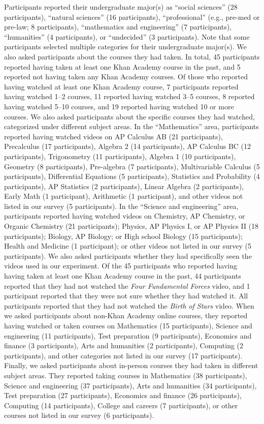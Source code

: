 \documentclass[10pt]{article}
\begin{document}
Participants reported their undergraduate major(s) as ``social sciences'' (28
participants), ``natural sciences'' (16 participants), ``professional'' (e.g.,
pre-med or pre-law; 8 participants), ``mathematics and engineering'' (7
participants), ``humanities'' (4 participants), or ``undecided'' (3
participants). Note that some participants selected multiple categories for
their undergraduate major(s). We also asked participants about the courses they
had taken. In total, 45 participants reported having taken at least one Khan
Academy course in the past, and 5 reported not having taken any Khan Academy
courses. Of those who reported having watched at least one Khan Academy course,
7 participants reported having watched 1--2 courses, 11 reported having watched
3--5 courses, 8 reported having watched 5--10 courses, and 19 reported having
watched 10 or more courses. We also asked participants about the specific
courses they had watched, categorized under different subject areas. In the
``Mathematics'' area, participants reported having watched videos on AP
Calculus AB (21 participants), Precalculus (17 participants), Algebra 2 (14
participants), AP Calculus BC (12 participants), Trigonometry (11
participants), Algebra 1 (10 participants), Geometry (8 participants),
Pre-algebra (7 participants), Multivariable Calculus (5 participants),
Differential Equations (5 participants), Statistics and Probability (4
participants), AP Statistics (2 participants), Linear Algebra (2 participants),
Early Math (1 participant), Arithmetic (1 participant), and other videos not
listed in our survey (5 participants). In the ``Science and engineering'' area,
participants reported having watched videos on Chemistry, AP Chemistry, or
Organic Chemistry (21 participants); Physics, AP Physics I, or AP Physics II
(18 participants); Biology, AP Biology; or High school Biology (15
participants); Health and Medicine (1 participant); or other videos not listed
in our survey (5 participants). We also asked participants whether they had
specifically seen the videos used in our experiment. Of the 45 participants who
reported having having taken at least one Khan Academy course in the past, 44
participants reported that they had not watched the \textit{Four Fundamental
Forces} video, and 1 participant reported that they were not sure whether they
had watched it. All participants reported that they had not watched the
\textit{Birth of Stars} video. When we asked participants about non-Khan
Academy online courses, they reported having watched or taken courses on
Mathematics (15 participants), Science and engineering (11 participants), Test
preparation (9 participants), Economics and finance (3 participants), Arts and
humanities (2 participants), Computing (2 participants), and other categories
not listed in our survey (17 participants). Finally, we asked participants
about in-person courses they had taken in different subject areas. They
reported taking courses in Mathematics (38 participants), Science and
engineering (37 participants), Arts and humanities (34 participants), Test
preparation (27 participants), Economics and finance (26 participants),
Computing (14 participants), College and careers (7 participants), or other
courses not listed in our survey (6 participants).
\end{document}
